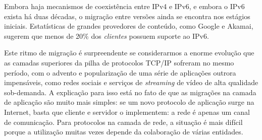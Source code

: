 \documentclass{article}
\begin{document}
Embora haja mecanismos de coexistência entre IPv4 e IPv6, e embora o IPv6 exista há duas décadas, o migração entre versões ainda se encontra nos estágios iniciais. Estatísticas de grandes provedores de conteúdo, como Google e Akamai, sugerem que menos de 20\% dos \textit{clientes} possuem suporte ao IPv6.

Este ritmo de migração é surpreendente se considerarmos a enorme evolução que as camadas superiores da pilha de protocolos TCP/IP sofreram no mesmo período, com o advento e popularização de uma série de aplicações outrora impensáveis, como redes sociais e serviços de \textit{streaming} de vídeo de alta qualidade sob-demanda. A explicação para isso está no fato de que as migrações na camada de aplicação são muito mais simples: se um novo protocolo de aplicação surge na Internet, basta que cliente e servidor o implementem: a rede é apenas um canal de comunicação. Para protocolos na camada de rede, a situação é mais difícil porque a utilização muitas vezes depende da colaboração de várias entidades.
\end{document}
